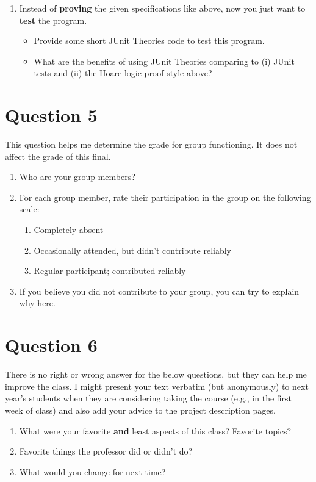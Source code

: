 \documentclass[10pt]{article}
\begin{document}
\begin{enumerate}
  \item Instead of \textbf{proving} the given specifications like above, now you just want to \textbf{test} the program.
    \begin{itemize}
    \item Provide some short JUnit Theories code to test this program.
    \item What are the benefits of using JUnit Theories comparing to (i) JUnit tests and (ii) the Hoare logic proof style above?
    \end{itemize}
\end{enumerate}



\newpage
\section{Question 5}

This question helps me determine the grade for group functioning.  It does not affect the grade of this final.

\begin{enumerate}
\item Who are your group members?
\item For each group member, rate their participation in the group on the following scale:
  \begin{enumerate}
  \item Completely absent
  \item Occasionally attended, but didn't contribute reliably
  \item Regular participant; contributed reliably
  \end{enumerate}
\item If you believe you did not contribute to your group, you can try to explain why here.
\end{enumerate}



\newpage
\section{Question 6}


There is no right or wrong answer for the below questions, but they can help me improve the class. 
I might present your text verbatim (but anonymously) to next year's students when they are considering taking the course (e.g., in the first week of class) and also add your advice to the project description pages.

\begin{enumerate}
\item What were your favorite \textbf{and} least aspects of this class? Favorite topics?
\item Favorite things the professor did or didn't do?
\item What would you change for next time?
\end{enumerate}
\end{document}
